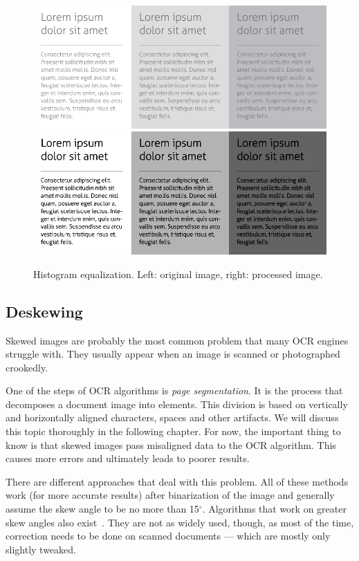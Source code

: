 \begin{figure}[t]
\centering
\includegraphics[width=0.4\linewidth]{img/preprocessing/contrast_low.png}
\qquad
\includegraphics[width=0.4\linewidth]{img/preprocessing/contrast_high.png}
\caption{Histogram equalization. Left: original image, right: processed image.}
\label{fig:preprocessHistogramEqualization}
\end{figure}


\subsection{Deskewing}

Skewed images are probably the most common problem that many OCR engines struggle with. They usually appear when an image is scanned or photographed crookedly. 

One of the steps of OCR algorithms is \emph{page segmentation}. It is the process that decomposes a document image into elements. This division is based on vertically and horizontally aligned characters, spaces and other artifacts. We will discuss this topic thoroughly in the following chapter. For now, the important thing to know is that skewed images pass misaligned data to the OCR algorithm. This causes more errors and ultimately leads to poorer results.

There are different approaches that deal with this problem. All of these methods work (for more accurate results) after binarization of the image and generally assume the skew angle to be no more than 15$^{\circ}$. Algorithms that work on greater skew angles also exist~\citep{skewAngleDetection}. They are not as widely used, though, as most of the time, correction needs to be done on scanned documents --- which are mostly only slightly tweaked.

